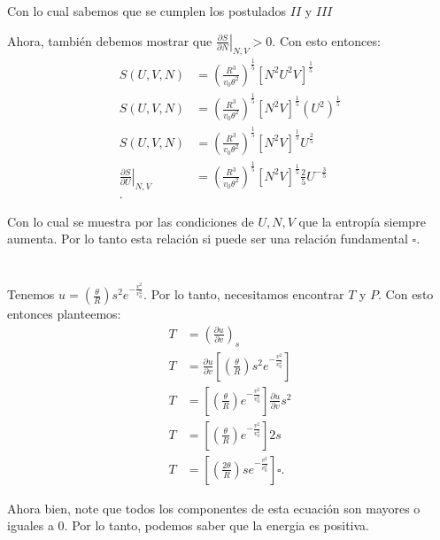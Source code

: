 \documentclass{report}
\begin{document}
Con lo cual sabemos que se cumplen los postulados $II$ y  $III$

Ahora, también debemos mostrar que $\left. \frac{\partial S}{\partial N}  \right|_{N, V} > 0 $. Con esto entonces:
  \begin{align*}
  S\left( U, V, N \right) &= \left( \frac{R^{3}}{v_0 \theta^2} \right)^{\frac{1}{5}} \left[ N^2 U^2 V \right]^{\frac{1}{5}} \\
  S\left( U, V, N \right) &= \left( \frac{R^{3}}{v_0 \theta^2} \right)^{\frac{1}{5}} \left[ N^2  V \right]^{\frac{1}{5}} \left( U^2 \right)^{\frac{1}{5}}  \\
  S\left( U, V, N \right) &= \left( \frac{R^{3}}{v_0 \theta^2} \right)^{\frac{1}{5}} \left[ N^2  V \right]^{\frac{1}{5}} U^{\frac{2}{5}}  \\
  \left. \frac{\partial S}{\partial U}  \right|_{N, V} &= \left( \frac{R^{3}}{v_0 \theta^2} \right)^{\frac{1}{5}} \left[ N^2  V \right]^{\frac{1}{5}} \frac{2}{5}U^{-\frac{3}{5}} \\
  .\end{align*}

  Con lo cual se muestra por las condiciones de $U, N, V$ que la entropía siempre aumenta. Por lo tanto esta relación si puede ser una relación fundamental $\square$.

\chapter{}

Tenemos $u = \left(\frac{\theta}{R}\right)s^2 e^{- \frac{v^2}{v_0^2}}$. Por lo tanto, necesitamos encontrar $T$ y $P$. Con esto entonces planteemos:
\begin{align*}
  T &= \left(\frac{\partial u}{\partial v}\right)_s \\
  T &= \frac{\partial u}{\partial v} \left[ \left( \frac{\theta}{R} \right)s^2 e^{- \frac{v^2}{v^2_0}} \right] \\
  T &= \left[ \left( \frac{\theta}{R} \right)e^{- \frac{v^2}{v^2_0}} \right] \frac{\partial u}{\partial v} s^2 \\
  T &= \left[ \left( \frac{\theta}{R} \right)e^{- \frac{v^2}{v^2_0}} \right]  2 s \\
  T &= \left[ \left( \frac{2\theta}{R} \right) s e^{- \frac{v^2}{v^2_0}} \right] \square.
\end{align*}

Ahora bien, note que todos los componentes de esta ecuación son mayores o iguales a 0. Por lo tanto, podemos saber que la energia es positiva.
\end{document}

